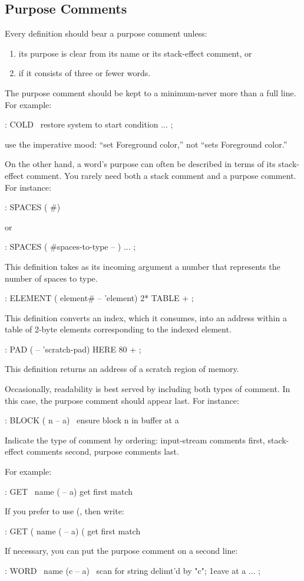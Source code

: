 \subsection{Purpose Comments}

\begin{tip}
Every definition should bear a purpose comment unless:
\begin{enumerate}
\item its purpose is clear from its name or its stack-effect comment, or
\item if it consists of three or fewer words.
\end{enumerate}
\end{tip}

The purpose comment should be kept to a minimum-never more than a
full line.  For example:
\begin{Code}
: COLD \ restore system to start condition
   ... ;
\end{Code}
use the imperative mood: ``set Foreground color,'' not ``sets Foreground
color.''

On the other hand, a word's purpose can often be described in terms
of its stack-effect comment.  You rarely need both a stack comment and a
purpose comment.  For instance:
\begin{Code}
: SPACES ( #)
\end{Code}
or
\begin{Code}
: SPACES  ( #spaces-to-type -- )  ... ;
\end{Code}
This definition takes as its incoming argument a number that represents
the number of spaces to type.
\begin{Code}
: ELEMENT  ( element# -- 'element)  2*  TABLE + ;
\end{Code}
This definition converts an index, which it consumes, into an address
within a table of 2-byte elements corresponding to the indexed element.
\begin{Code}
: PAD ( -- 'scratch-pad)  HERE 80 + ;
\end{Code}
This definition returns an address of a scratch region of memory.

Occasionally, readability is best served by including both types of
comment.  In this case, the purpose comment should appear last.  For
instance:
\begin{Code}
: BLOCK  ( n -- a)  \  ensure block n in buffer at a
\end{Code}

\begin{tip}
Indicate the type of comment by ordering: input-stream comments first,
stack-effect comments second, purpose comments last.
\end{tip}
For example:
\begin{Code}
: GET  \  name  ( -- a)   get first match
\end{Code}
If you prefer to use (, then write:
\begin{Code}
: GET  (  name  ( -- a) ( get first match
\end{Code}
If necessary, you can put the purpose comment on a second line:
\begin{Code}
: WORD   \   name   (c -- a)
   \ scan for string delimt'd by "c"; 1eave at a
   ... ;
\end{Code}
